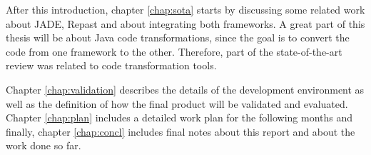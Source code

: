 After this introduction, chapter \ref{chap:sota} starts by discussing some related work about JADE, Repast and about integrating both frameworks. A great part of this thesis will be about Java code transformations, since the goal is to convert the code from one framework to the other. Therefore, part of the state-of-the-art review was related to code transformation tools.

Chapter \ref{chap:validation} describes the details of the development environment as well as the definition of how the final product will be validated and evaluated. Chapter \ref{chap:plan} includes a detailed work plan for the following months and finally, chapter \ref{chap:concl} includes final notes about this report and about the work done so far.